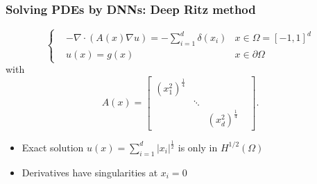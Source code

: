 \documentclass{beamer}
\begin{document}
\begin{frame}
\frametitle{Solving PDEs by DNNs: Deep Ritz method }

\begin{equation*}
\left\{
\begin{aligned}
&-\nabla \cdot ( A(x) \nabla u) = - \sum_{i=1}^d\delta(x_i) & x\in \Omega=[-1,1]^d\\
&u(x) = g(x)  & x\in \partial \Omega
\end{aligned}\right.
\end{equation*} 
with
\begin{equation*}
	A(x)= 
	\left[\begin{matrix}
		(x_1^2)^{\frac{1}{4}} & & \\
		& \ddots & &\\
		& &  (x_d^2)^{\frac{1}{4}}
	\end{matrix}\right].
\end{equation*}
\begin{itemize}
	\item Exact solution $u(x)= \sum_{i=1}^d|x_i|^{\frac{1}{2}}$ is only in $H^{1/2}(\Omega)$ 
	\item Derivatives have singularities at $x_i =0$
\end{itemize}

\end{frame}
\end{document}
